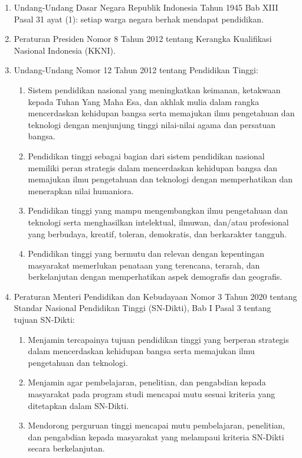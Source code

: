 \begin{enumerate}
\item Undang-Undang Dasar Negara Republik Indonesia Tahun 1945 Bab XIII Pasal 31 ayat (1): setiap warga negara berhak mendapat pendidikan.
\item Peraturan Presiden Nomor 8 Tahun 2012 tentang Kerangka Kualifikasi Nasional Indonesia (KKNI).
\item Undang-Undang Nomor 12 Tahun 2012 tentang Pendidikan Tinggi:
  \begin{enumerate}
  \item Sistem pendidikan nasional yang meningkatkan keimanan, ketakwaan kepada Tuhan Yang Maha Esa, dan akhlak mulia dalam rangka mencerdaskan kehidupan bangsa serta memajukan ilmu pengetahuan dan teknologi dengan menjunjung tinggi nilai-nilai agama dan persatuan bangsa.
  \item Pendidikan tinggi sebagai bagian dari sistem pendidikan nasional memiliki peran strategis dalam mencerdaskan kehidupan bangsa dan memajukan ilmu pengetahuan dan teknologi dengan memperhatikan dan menerapkan nilai humaniora.
  \item Pendidikan tinggi yang mampu mengembangkan ilmu pengetahuan dan teknologi serta menghasilkan intelektual, ilmuwan, dan/atau profesional yang berbudaya, kreatif, toleran, demokratis, dan berkarakter tangguh.
  \item Pendidikan tinggi yang bermutu dan relevan dengan kepentingan masyarakat memerlukan penataan yang terencana, terarah, dan berkelanjutan dengan memperhatikan aspek demografis dan geografis.
  \end{enumerate}
\item Peraturan Menteri Pendidikan dan Kebudayaan Nomor 3 Tahun 2020 tentang Standar Nasional Pendidikan Tinggi (SN-Dikti), Bab I Pasal 3 tentang tujuan SN-Dikti:
  \begin{enumerate}
  \item Menjamin tercapainya tujuan pendidikan tinggi yang berperan strategis dalam mencerdaskan kehidupan bangsa serta memajukan ilmu pengetahuan dan teknologi.
  \item Menjamin agar pembelajaran, penelitian, dan pengabdian kepada masyarakat pada program studi mencapai mutu sesuai kriteria yang ditetapkan dalam SN-Dikti.
  \item Mendorong perguruan tinggi mencapai mutu pembelajaran, penelitian, dan pengabdian kepada masyarakat yang melampaui kriteria SN-Dikti secara berkelanjutan.
  \end{enumerate}

\end{enumerate}
